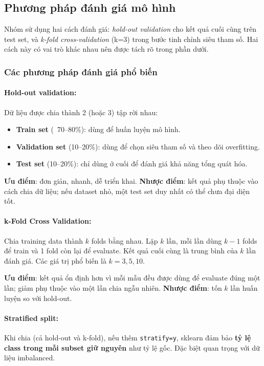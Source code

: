 \documentclass[12pt, a4paper]{article}
\begin{document}
\subsection{Phương pháp đánh giá mô hình}

Nhóm sử dụng hai cách đánh giá: \emph{hold-out validation} cho kết quả cuối cùng trên test set, và \emph{k-fold cross-validation} (k=3) trong bước tinh chỉnh siêu tham số. Hai cách này có vai trò khác nhau nên được tách rõ trong phần dưới.

\subsubsection{Các phương pháp đánh giá phổ biến}

\paragraph{Hold-out validation:} Dữ liệu được chia thành 2 (hoặc 3) tập rời nhau:
\begin{itemize}
    \item \textbf{Train set} (~70--80\%): dùng để huấn luyện mô hình.
    \item \textbf{Validation set} (10--20\%): dùng để chọn siêu tham số và theo dõi overfitting.
    \item \textbf{Test set} (10--20\%): chỉ dùng ở cuối để đánh giá khả năng tổng quát hóa.
\end{itemize}

\textbf{Ưu điểm}: đơn giản, nhanh, dễ triển khai. \textbf{Nhược điểm}: kết quả phụ thuộc vào cách chia dữ liệu; nếu dataset nhỏ, một test set duy nhất có thể chưa đại diện tốt.

\paragraph{k-Fold Cross Validation:} Chia training data thành $k$ folds bằng nhau. Lặp $k$ lần, mỗi lần dùng $k-1$ folds để train và 1 fold còn lại để evaluate. Kết quả cuối cùng là trung bình của $k$ lần đánh giá. Các giá trị phổ biến là $k=3, 5, 10$.

\textbf{Ưu điểm}: kết quả ổn định hơn vì mỗi mẫu đều được dùng để evaluate đúng một lần; giảm phụ thuộc vào một lần chia ngẫu nhiên. \textbf{Nhược điểm}: tốn $k$ lần huấn luyện so với hold-out.

\paragraph{Stratified split:} Khi chia (cả hold-out và k-fold), nếu thêm \texttt{stratify=y}, sklearn đảm bảo \textbf{tỷ lệ class trong mỗi subset giữ nguyên} như tỷ lệ gốc. Đặc biệt quan trọng với dữ liệu imbalanced.
\end{document}
